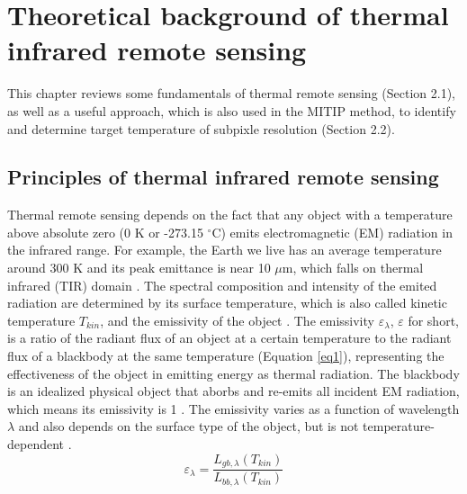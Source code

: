 \chapter{Theoretical background of thermal infrared remote sensing}

\label{Chapter2}

This chapter reviews some fundamentals of thermal remote sensing (Section 2.1), as well as a useful approach, which is also used in the MITIP method, to identify and determine target temperature of subpixle resolution (Section 2.2). \\


\section{Principles of thermal infrared remote sensing}
Thermal remote sensing depends on the fact that any object with a temperature above absolute zero (0 K or -273.15 $^\circ$C) emits electromagnetic (EM) radiation in the infrared range. For example, the Earth we live has an average temperature around 300 K and its peak emittance is near 10 $\mu$m, which falls on thermal infrared (TIR) domain \parencite {Reference201, Reference202}. The spectral composition and intensity of the emited radiation are determined by its surface temperature, which is also called kinetic temperature $T_{kin}$,  and the emissivity of the object \parencite{Reference207}. The emissivity $\varepsilon_{\lambda}$, $\varepsilon$ for short, is a ratio of the radiant flux of an object at a certain temperature to the radiant flux of a blackbody at the same temperature (Equation \eqref{eq1}), representing the effectiveness of the object in emitting energy as thermal radiation. The blackbody is an idealized physical object that aborbs and re-emits all incident EM radiation, which means its emissivity is 1 \parencite{Reference206, Reference204}. The emissivity varies as a function of wavelength $\lambda$ and also depends on the surface type of the object, but is not temperature-dependent \parencite{Reference203}.\\
\begin{equation}
\label{eq1}
\varepsilon_{\lambda} = \frac{L_{gb, \lambda}(T_{kin})}{L_{bb, \lambda}(T_{kin})}
\end{equation}

